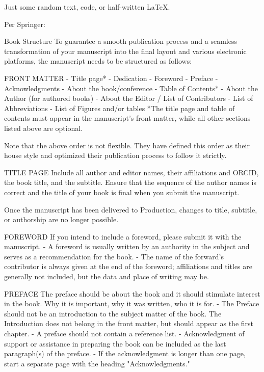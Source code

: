 Just some random text, code, or half-written LaTeX.


Per Springer:

Book Structure
To guarantee a smooth publication process and a seamless transformation of your manuscript into the final layout and various electronic platforms, the manuscript needs to be structured as follows:

FRONT MATTER
- Title page*
    - Dedication
    - Foreword
    - Preface
    - Acknowledgments
    - About the book/conference
- Table of Contents*
    - About the Author (for authored books)
    - About the Editor / List of Contributors
    - List of Abbreviations
    - List of Figures and/or tables
*The title page and table of contents must appear in the manuscript's front matter, while all other sections listed above are optional.

Note that the above order is not flexible. They have defined this order as their house style and optimized their publication process to follow it strictly.

TITLE PAGE
Include all author and editor names, their affiliations and ORCID, the book title, and the subtitle. Ensure that the sequence of the author names is correct and the title of your book is final when you submit the manuscript.

Once the manuscript has been delivered to Production, changes to title, subtitle, or authorship are no longer possible.

FOREWORD
If you intend to include a foreword, please submit it with the manuscript.
- A foreword is usually written by an authority in the subject and serves as a recommendation for the book.
- The name of the forward's contributor is always given at the end of the foreword; affiliations and titles are generally not included, but the data and place of writing may be.

PREFACE
The preface should be about the book and it should stimulate interest in the book. Why it is important, why it was written, who it is for.
- The Preface should not be an introduction to the subject matter of the book. The Introduction does not belong in the front matter, but should appear as the first chapter.
- A preface should not contain a reference list.
- Acknowledgment of support or assistance in preparing the book can be included as the last paragraph(s) of the preface.
- If the acknowledgment is longer than one page, start a separate page with the heading "Acknowledgments."

